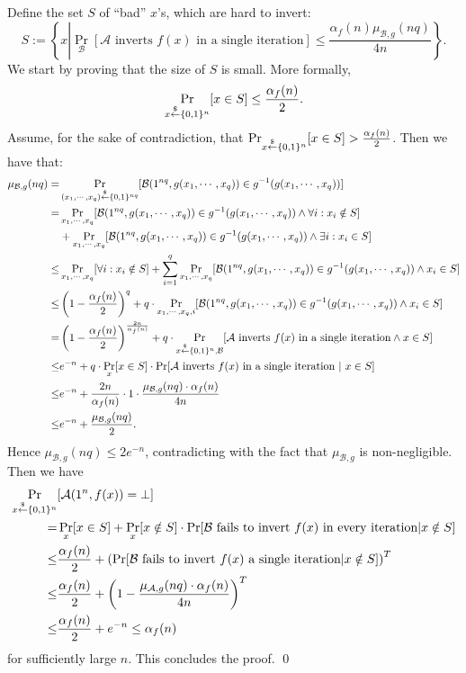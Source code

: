 Define the set $S$ of ``bad'' $x$'s, which are hard to invert:
$$S := \left\{x \left| \Pr_\mathcal{B}\left[\mathcal{A} \text{ inverts $f(x)$ in a single iteration} \right] \leq \frac{\alpha_f(n) \mu_{\mathcal{B},g}(nq)}{4n} \right. \right\}.$$
We start by proving that the size of $S$ is small. More formally,
$$\Pr_{x \stackrel{\$}{\leftarrow} \{ 0, 1 \}^{n}} [x \in S] \leq \frac{\alpha_f(n)}{2}.$$
Assume, for the sake of contradiction, that $\Pr_{x \stackrel{\$}{\leftarrow} \{ 0, 1 \}^{n}} [x \in S]  > \frac{\alpha_f(n)}{2}$. Then we have that:
\begin{align*}
\mu_{\mathcal{B},g}(nq) =& \Pr_{(x_1, \cdots, x_q) \stackrel{\$}{\leftarrow} \{ 0, 1 \}^{nq}}[ \mathcal{B}(1^{nq}, g(x_1, \cdots, x_q)) \in g^{-1}(g(x_1, \cdots, x_q))]\\
=&  \Pr_{x_1, \cdots, x_q}[ \mathcal{B}(1^{nq}, g(x_1, \cdots, x_q)) \in g^{-1}(g(x_1, \cdots, x_q)) \wedge \forall i: x_i \notin S]\\
& + \Pr_{x_1, \cdots, x_q}[ \mathcal{B}(1^{nq}, g(x_1, \cdots, x_q)) \in g^{-1}(g(x_1, \cdots, x_q)) \wedge \exists i: x_i \in S]\\
\leq& \Pr_{x_1, \cdots, x_q}[ \forall i: x_i \notin S]
+ \sum_{i=1}^q \Pr_{x_1, \cdots, x_q}[ \mathcal{B}(1^{nq}, g(x_1, \cdots, x_q)) \in g^{-1}(g(x_1, \cdots, x_q)) \wedge  x_i \in S]\\
\leq& \left( 1-\frac{\alpha_f(n)}{2}\right)^q
+ q \cdot \Pr_{x_1, \cdots, x_q,i}[ \mathcal{B}(1^{nq}, g(x_1, \cdots, x_q)) \in g^{-1}(g(x_1, \cdots, x_q)) \wedge x_i \in S] \\
=& \left( 1-\frac{\alpha_f(n)}{2}\right)^{\frac{2n}{\alpha_f(n)}}
+  q\cdot \Pr_{x \stackrel{\$}{\leftarrow} \{ 0, 1 \}^{n}, \mathcal{B}}[\mathcal{A} \text{ inverts $f(x)$ in a single iteration}  \wedge x \in S]\\
\leq& e^{-n} + q\cdot  \Pr_{x}[x \in S] \cdot \Pr[\mathcal{A} \text{ inverts $f(x)$ in a single iteration} ~|~ x \in S]\\
\leq& e^{-n} + \frac{2n}{\alpha_f(n)} \cdot  1 \cdot \frac{\mu_{\mathcal{B},g}(nq) \cdot \alpha_f(n)}{4n}\\
\leq& e^{-n} + \frac{\mu_{\mathcal{B},g}(nq)}{2}.
\end{align*}
Hence $\mu_{\mathcal{B},g}(nq) \leq 2 e^{-n}$, contradicting with the fact that $\mu_{\mathcal{B},g}$ is non-negligible.
Then we have
\begin{align*}
\Pr_{x \stackrel{\$}{\leftarrow} \{ 0, 1 \}^{n}}&[ \mathcal{A}(1^n, f(x)) = \bot]\\
=& \Pr_x[x \in S] + \Pr_x [x \notin S]\cdot\Pr[\mathcal{B} \text{ fails to invert $f(x)$ in every iteration} | x \notin S]\\
\leq& \frac{\alpha_f(n)}{2}+ \left(\Pr[ \mathcal{B} \text{ fails to invert $f(x)$ a single iteration} | x \notin S] \right)^T\\
\leq & \frac{\alpha_f(n)}{2}+ \left( 1-\frac{\mu_{\mathcal{A},g}(nq) \cdot \alpha_f(n)}{4n}\right)^T\\
\leq& \frac{\alpha_f(n)}{2} + e^{-n} \leq \alpha_f(n)
\end{align*}
for sufficiently large $n$. This concludes the proof.
\qed


